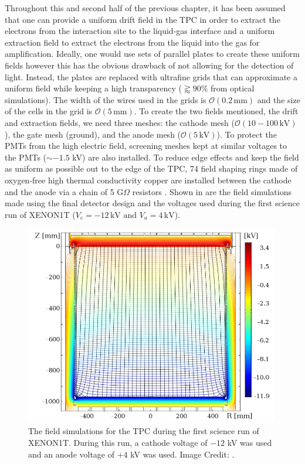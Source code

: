 Throughout this and second half of the previous chapter, it has been assumed that one can provide a uniform drift field in the TPC in order to extract the electrons from the interaction site to the liquid-gas interface and a uniform extraction field to extract the electrons from the liquid into the gas for amplification.  Ideally, one would use sets of parallel plates to create these uniform fields however this has the obvious drawback of not allowing for the detection of light.  Instead, the plates are replaced with ultrafine grids that can approximate a uniform field while keeping a high transparency ($\gtrapprox 90 \%$ from optical simulations).  The width of the wires used in the grids is $\mathcal{O}(0.2 \, \textrm{mm})$ and the size of the cells in the grid is $\mathcal{O}(5 \, \textrm{mm})$.  To create the two fields mentioned, the drift and extraction fields, we need three meshes: the cathode mesh ($\mathcal{O}(10-100 \, \textrm{kV})$), the gate mesh (ground), and the anode mesh ($\mathcal{O}(5 \, \textrm{kV})$).  To protect the PMTs from the high electric field, screening meshes kept at similar voltages to the PMTs ($\sim -1.5$ kV) are also installed.  To reduce edge effects and keep the field as uniform as possible out to the edge of the TPC, 74 field shaping rings made of oxygen-free high thermal conductivity copper are installed between the cathode and the anode via a chain of 5 G$\Omega$ resistors \cite{aprile2017xenon1t}.  Shown in  are the field simulations made using the final detector design and the voltages used during the first science run of XENON1T ($V_c = -12 \, \textrm{kV} \textrm{ and } V_a = 4 \, \textrm{kV}$).  



\begin{figure}[t]
	\centering
	\includegraphics[width=0.99\textwidth]{xe1t_sr0_field_sim}
	\caption{The field simulations for the TPC during the first science run of XENON1T.  During this run, a cathode voltage of $-12$ kV was used and an anode voltage of $+4$ kV was used.  Image Credit: .}
	\label{fig:xe1t_sr0_field_sim}
\end{figure}


